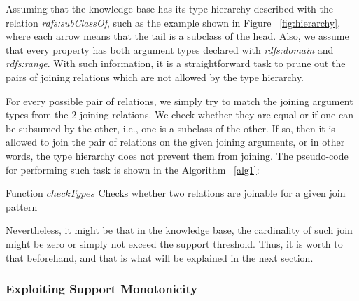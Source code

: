 Assuming that the knowledge base has its type hierarchy described with the relation \emph{rdfs:subClassOf}, such as
the
example shown in Figure ~\ref{fig:hierarchy}, where each arrow means that the tail is a subclass of the head. Also,
we assume that every property has both argument types declared with \emph{rdfs:domain} and \emph{rdfs:range}. With
such information, it is a straightforward task to prune out the pairs of joining relations which are not allowed by
the type hierarchy.    

For every possible pair of relations, we simply try to match the joining argument types from the 2 joining relations.
We
check whether they are equal or if one can be subsumed by the other, i.e., one is a subclass of the other. If so, then
it is allowed to join the pair of relations on the given joining arguments, or in other words, the type hierarchy does
not prevent them from joining. The pseudo-code for performing such task is shown in the Algorithm ~\ref{alg1}:

\begin{algorithm}[h!]
  \caption{Function $checkTypes$ \newline Checks whether two relations are joinable for a given join pattern}
 \label{alg1}
   {
  }
   {
  }
\end{algorithm}

Nevertheless, it might be that in the knowledge base, the cardinality of such join might be zero or simply not exceed
the support threshold. Thus, it is worth to that beforehand, and that is what will be explained in the next section.

\subsubsection{Exploiting Support Monotonicity}

